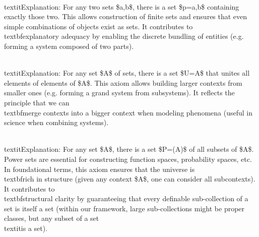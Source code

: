 \documentclass[11pt]{article}
\begin{document}
\begin{enumerate}
  \item \\textbf{Pairing:} \$\forall a,\forall b,\exists p,\forall x,\[x \in p \Leftrightarrow (x=a \vee x=b)]\$.
\end{enumerate}
   \\textit{Explanation:} For any two sets \$a,b\$, there is a set \$p={a,b}\$ containing exactly those two. This allows construction of finite sets and ensures that even simple combinations of objects exist as sets. It contributes to \\textbf{explanatory adequacy} by enabling the discrete bundling of entities (e.g. forming a system composed of two parts).

\begin{enumerate}
  \item \\textbf{Union:} \$\forall A,\exists U,\forall x,\[x \in U \Leftrightarrow \exists y,(y \in A \wedge x \in y)]\$.
\end{enumerate}
   \\textit{Explanation:} For any set \$A\$ of sets, there is a set \$U=\bigcup A\$ that unites all elements of elements of \$A\$. This axiom allows building larger contexts from smaller ones (e.g. forming a grand system from subsystems). It reflects the principle that we can \\textbf{merge contexts} into a bigger context when modeling phenomena (useful in science when combining systems).

\begin{enumerate}
  \item \\textbf{Power Set:} \$\forall A,\exists P,\forall x,\[x \in P \Leftrightarrow x \subseteq A]\$.
\end{enumerate}
   \\textit{Explanation:} For any set \$A\$, there is a set \$P=(A)\$ of all subsets of \$A\$. Power sets are essential for constructing function spaces, probability spaces, etc. In foundational terms, this axiom ensures that the universe is \\textbf{rich in structure} (given any context \$A\$, one can consider all subcontexts). It contributes to \\textbf{structural clarity} by guaranteeing that every definable sub-collection of a set is itself a set (within our framework, large sub-collections might be proper classes, but any subset of a set \\textit{is} a set).
\end{document}

